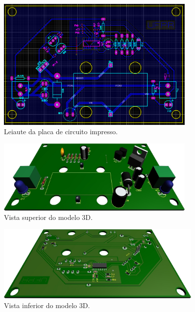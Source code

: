 \documentclass[a4paper]{article}
\begin{document}
{\begin{figure}[H]
	\centering
	\includegraphics[width=0.87\textwidth]{pcb-layout.png}
	\caption{Leiaute da placa de circuito impresso.}
	\label{fig:pcb-layout}
\end{figure}

\begin{figure}[H]
	\centering
	\includegraphics[width=0.87\textwidth]{3d-top.jpg}
	\caption{Vista superior do modelo 3D.}
	\label{fig:3d-top}
\end{figure}

\begin{figure}[H]
	\centering
	\includegraphics[width=0.9\textwidth]{3d-bottom.jpg}
	\caption{Vista inferior do modelo 3D.}
	\label{fig:3d-bot}
\end{figure}

}
\end{document}
